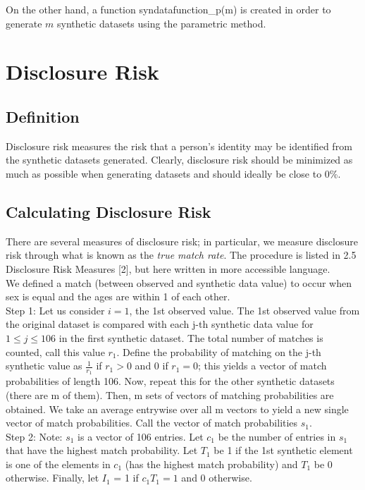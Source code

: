 \documentclass[12pt]{article}
\begin{document}
On the other hand, a function syndatafunction\_p(m) is created in order to generate $m$ synthetic datasets using the parametric method. 

\section*{Disclosure Risk}

\subsection*{Definition}
Disclosure risk measures the risk that a person's identity may be identified from the synthetic datasets generated. Clearly, disclosure risk should be minimized as much as possible when generating datasets and should ideally be close to 0\%. 

\subsection*{Calculating Disclosure Risk}
There are several measures of disclosure risk; in particular, we measure disclosure risk through what is known as the \textit{true match rate}. The procedure is listed in 2.5 Disclosure Risk Measures [2], but here written in more accessible language.\\

We defined a match (between observed and synthetic data value) to occur when sex is equal and the ages are within 1 of each other.\\

Step 1: Let us consider $i=1$, the 1st observed value. The 1st observed value from the original dataset is compared with each j-th synthetic data value for $1 \leq j \leq 106$ in the first synthetic dataset. The total number of matches is counted, call this value $r_1$. Define the probability of matching on the j-th synthetic value as $\frac{1}{r_1}$ if $r_1 > 0$ and 0 if $r_1 = 0$; this yields a vector of match probabilities of length 106. Now, repeat this for the other synthetic datasets (there are m of them). Then, m sets of vectors of matching probabilities are obtained. We take an average entrywise over all m vectors to yield a new single vector of match probabilities. Call the vector of match probabilities $s_1$.\\

Step 2: Note: $s_1$ is a vector of 106 entries. Let $c_1$ be the number of entries in $s_1$ that have the highest match probability. Let $T_1$ be 1 if the 1st synthetic element is one of the elements in $c_1$ (has the highest match probability) and $T_1$ be 0 otherwise. Finally, let $I_1$ = 1 if $c_1 T_1 = 1$ and 0 otherwise. \\
\end{document}
